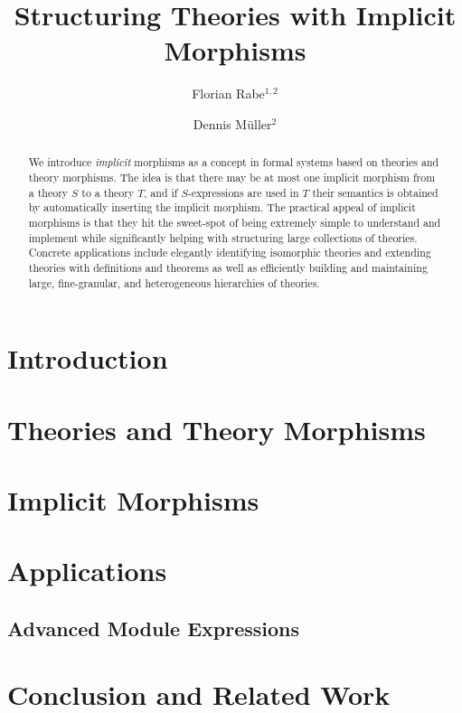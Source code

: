 \documentclass[orivec]{llncs}
\begin{document}
\title{Structuring Theories with Implicit Morphisms}
\author{Florian Rabe$^{1,2}$ \and Dennis M\"uller$^2$}
\maketitle

\begin{abstract}
We introduce \emph{implicit} morphisms as a concept in formal systems based on theories and theory morphisms.
The idea is that there may be at most one implicit morphism from a theory $S$ to a theory $T$, and if $S$-expressions are used in $T$ their semantics is obtained by automatically inserting the implicit morphism.
The practical appeal of implicit morphisms is that they hit the sweet-spot of being extremely simple to understand and implement while significantly helping with structuring large collections of theories.
Concrete applications include elegantly identifying isomorphic theories and extending theories with definitions and theorems as well as efficiently building and maintaining large, fine-granular, and heterogeneous hierarchies of theories.
\end{abstract}


\section{Introduction}


\section{Theories and Theory Morphisms}\label{sec:mmt}


%

\section{Implicit Morphisms}\label{sec:impl}


\section{Applications}\label{sec:appl}


\begin{modexp}
\section{Advanced Module Expressions}\label{sec:complex}

\end{modexp}

\section{Conclusion and Related Work}\label{sec:conc}





\end{document}
